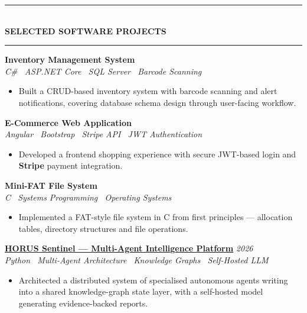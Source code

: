 \documentclass[10pt, a4paper]{article}
\newcommand{\cvsection}[1]{%
  \vspace{3pt}%
  {\color{navy}\rule{\linewidth}{1.1pt}}\\[0.5pt]%
  {\color{navy}\bfseries\fontsize{9.5}{11}\selectfont\uppercase{#1}}\\[-4pt]%
  {\color{teal}\rule{\linewidth}{0.6pt}}%
  \vspace{2pt}%
}
\newcommand{\cvproject}[3]{%
  \vspace{2.5pt}%
  {\bfseries\color{navy}#1} \hfill {\color{midgray}\textit{#3}}\\[-1.5pt]%
  {\color{teal}\textit{#2}}%
}
\newenvironment{cvitems}{%
  \begin{itemize}[leftmargin=11pt, itemsep=0.5pt, parsep=0pt, topsep=1pt,
                  label={\textcolor{teal}{$\bullet$}}]
}{%
  \end{itemize}%
}
\begin{document}
\cvsection{Selected Software Projects}

\cvproject{Inventory Management System}
          {C\# \textperiodcentered\ ASP.NET Core \textperiodcentered\ SQL Server \textperiodcentered\ Barcode Scanning}
          {}
\begin{cvitems}
  \item Built a CRUD-based inventory system with barcode scanning and alert notifications, covering database schema design through user-facing workflow.
\end{cvitems}

\cvproject{E-Commerce Web Application}
          {Angular \textperiodcentered\ Bootstrap \textperiodcentered\ Stripe API \textperiodcentered\ JWT Authentication}
          {}
\begin{cvitems}
  \item Developed a frontend shopping experience with secure JWT-based login and \textbf{Stripe} payment integration.
\end{cvitems}

\cvproject{Mini-FAT File System}
          {C \textperiodcentered\ Systems Programming \textperiodcentered\ Operating Systems}
          {}
\begin{cvitems}
  \item Implemented a FAT-style file system in C from first principles --- allocation tables, directory structures and file operations.
\end{cvitems}

\cvproject{\href{https://github.com/MahmoudAlyosify/horus-sentinel}{HORUS Sentinel --- Multi-Agent Intelligence Platform}}
          {Python \textperiodcentered\ Multi-Agent Architecture \textperiodcentered\ Knowledge Graphs \textperiodcentered\ Self-Hosted LLM}
          {2026}
\begin{cvitems}
  \item Architected a distributed system of specialised autonomous agents writing into a shared knowledge-graph state layer, with a self-hosted model generating evidence-backed reports.
\end{cvitems}
\end{document}
